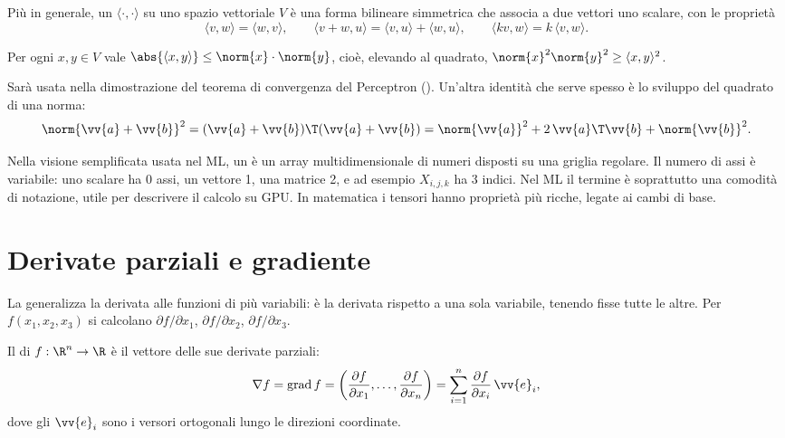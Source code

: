 Più in generale, un  $\langle\cdot,\cdot\rangle$ su uno spazio vettoriale $V$ è una
forma bilineare simmetrica che associa a due vettori uno scalare, con le proprietà
\[
\langle v,w\rangle = \langle w,v\rangle, \qquad
\langle v+w,u\rangle = \langle v,u\rangle + \langle w,u\rangle, \qquad
\langle kv,w\rangle = k\,\langle v,w\rangle .
\]

\begin{teorema}
Per ogni $x,y\in V$ vale $\abs{\langle x,y\rangle} \le \norm{x}\cdot\norm{y}$, cioè, elevando al quadrato,
$\norm{x}^2\norm{y}^2 \ge \langle x,y\rangle^2$.
\end{teorema}

Sarà usata nella dimostrazione del teorema di convergenza del Perceptron ().
Un'altra identità che serve spesso è lo sviluppo del quadrato di una norma:
\begin{equation}\label{eq:quadrato-norma}
\norm{\vv{a}+\vv{b}}^2 = (\vv{a}+\vv{b})\T(\vv{a}+\vv{b}) = \norm{\vv{a}}^2 + 2\,\vv{a}\T\vv{b} + \norm{\vv{b}}^2 .
\end{equation}

\begin{definizione}[Tensore]
Nella visione semplificata usata nel ML, un  è un array multidimensionale di numeri disposti su
una griglia regolare. Il numero di assi è variabile: uno scalare ha 0 assi, un vettore 1, una matrice 2, e ad
esempio $X_{i,j,k}$ ha 3 indici. Nel ML il termine è soprattutto una comodità di notazione, utile per
descrivere il calcolo su GPU. In matematica i tensori hanno proprietà più ricche, legate ai cambi di base.
\end{definizione}

\section{Derivate parziali e gradiente}
\label{sec:gradiente}

La  generalizza la derivata alle funzioni di più variabili: è la derivata rispetto a
una sola variabile, tenendo fisse tutte le altre. Per $f(x_1,x_2,x_3)$ si calcolano
$\partial f/\partial x_1$, $\partial f/\partial x_2$, $\partial f/\partial x_3$.

\begin{definizione}[Gradiente]
Il  di $f:\R^n\to\R$ è il vettore delle sue derivate parziali:
\begin{equation}
\nabla f = \operatorname{grad} f = \left(\frac{\partial f}{\partial x_1},\dots,\frac{\partial f}{\partial x_n}\right)
= \sum_{i=1}^{n}\frac{\partial f}{\partial x_i}\,\vv{e}_i ,
\end{equation}
dove gli $\vv{e}_i$ sono i versori ortogonali lungo le direzioni coordinate.
\end{definizione}


